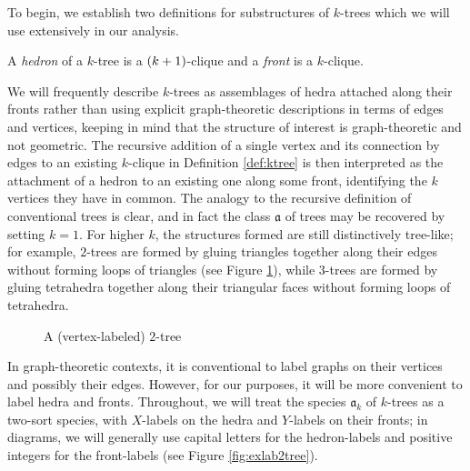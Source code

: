 \documentclass[sectionflow,singlespace,twoside,boldmathhdr,draft]{brandiss} %
\numberwithin{section}{chapter}
\numberwithin{figure}{chapter}
\begin{document}
To begin, we establish two definitions for substructures of $k$-trees which we will use extensively in our analysis.
\begin{definition}
  \label{def:hedfront}
  A \emph{hedron} of a $k$-tree is a $\left( {k+1} \right)$-clique and a \emph{front} is a $k$-clique.
\end{definition}
We will frequently describe $k$-trees as assemblages of hedra attached along their fronts rather than using explicit graph-theoretic descriptions in terms of edges and vertices, keeping in mind that the structure of interest is graph-theoretic and not geometric.
The recursive addition of a single vertex and its connection by edges to an existing $k$-clique in Definition \ref{def:ktree} is then interpreted as the attachment of a hedron to an existing one along some front, identifying the $k$ vertices they have in common.
The analogy to the recursive definition of conventional trees is clear, and in fact the class $\mathfrak{a}$ of trees may be recovered by setting $k = 1$.
For higher $k$, the structures formed are still distinctively tree-like; for example, $2$-trees are formed by gluing triangles together along their edges without forming loops of triangles (see Figure \ref{fig:ex2tree}), while $3$-trees are formed by gluing tetrahedra together along their triangular faces without forming loops of tetrahedra.

\begin{figure}[htb]
  \centering
  \caption{A (vertex-labeled) $2$-tree}
  \label{fig:ex2tree}
\end{figure}

In graph-theoretic contexts, it is conventional to label graphs on their vertices and possibly their edges.
However, for our purposes, it will be more convenient to label hedra and fronts.
Throughout, we will treat the species $\mathfrak{a}_{k}$ of $k$-trees as a two-sort species, with $X$-labels on the hedra and $Y$-labels on their fronts; in diagrams, we will generally use capital letters for the hedron-labels and positive integers for the front-labels (see Figure \ref{fig:exlab2tree}).
\end{document}
